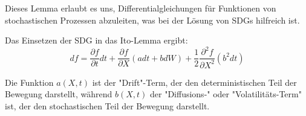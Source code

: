 Dieses Lemma erlaubt es uns, Differentialgleichungen für Funktionen von stochastischen Prozessen abzuleiten, was bei der Lösung von SDGs hilfreich ist.


Das Einsetzen der SDG in das Ito-Lemma ergibt:
\begin{equation}
	df = \frac{\partial f}{\partial t} dt + \frac{\partial f}{\partial X} (a dt + b dW) + \frac{1}{2} \frac{\partial^2 f}{\partial X^2} (b^2 dt)
\end{equation}

Die Funktion $ a(X,t) $ ist der "Drift"-Term, der den deterministischen Teil der Bewegung darstellt, während $ b(X,t) $ der "Diffusions-" oder "Volatilitäts-Term" ist, der den stochastischen Teil der Bewegung darstellt.






